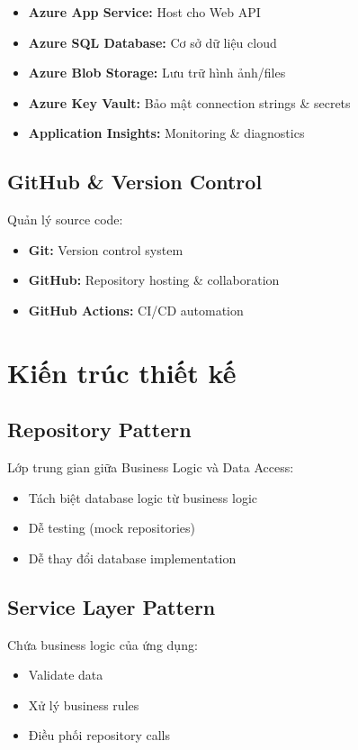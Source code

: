 \begin{itemize}
    \item \textbf{Azure App Service:} Host cho Web API
    \item \textbf{Azure SQL Database:} Cơ sở dữ liệu cloud
    \item \textbf{Azure Blob Storage:} Lưu trữ hình ảnh/files
    \item \textbf{Azure Key Vault:} Bảo mật connection strings \& secrets
    \item \textbf{Application Insights:} Monitoring \& diagnostics
\end{itemize}

\subsection{GitHub \& Version Control}
Quản lý source code:

\begin{itemize}
    \item \textbf{Git:} Version control system
    \item \textbf{GitHub:} Repository hosting \& collaboration
    \item \textbf{GitHub Actions:} CI/CD automation
\end{itemize}

\section{Kiến trúc thiết kế}

\subsection{Repository Pattern}
Lớp trung gian giữa Business Logic và Data Access:

\begin{itemize}
    \item Tách biệt database logic từ business logic
    \item Dễ testing (mock repositories)
    \item Dễ thay đổi database implementation
\end{itemize}

\subsection{Service Layer Pattern}
Chứa business logic của ứng dụng:

\begin{itemize}
    \item Validate data
    \item Xử lý business rules
    \item Điều phối repository calls
\end{itemize}

